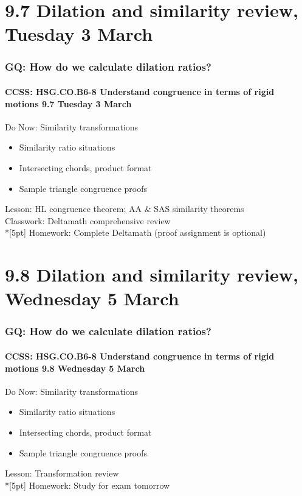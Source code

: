 \documentclass{beamer}
\begin{document}
\section{9.7 Dilation and similarity review, Tuesday 3 March}
\frame
{
  \frametitle{GQ: How do we calculate dilation ratios?}
  \framesubtitle{CCSS: HSG.CO.B6-8 Understand congruence in terms of rigid motions \hfill \alert{9.7 Tuesday 3 March}}
  \begin{block}{Do Now: Similarity transformations}
    \begin{itemize}
      \item Similarity ratio situations
      \item Intersecting chords, product format
      \item Sample triangle congruence proofs
    \end{itemize}
    \end{block}
    Lesson: HL congruence theorem; AA \& SAS similarity theorems \\
    Classwork: Deltamath comprehensive review \\*[5pt]
    Homework: Complete Deltamath (proof assignment is optional)
}

\section{9.8 Dilation and similarity review, Wednesday 5 March}
\frame
{
  \frametitle{GQ: How do we calculate dilation ratios?}
  \framesubtitle{CCSS: HSG.CO.B6-8 Understand congruence in terms of rigid motions \hfill \alert{9.8 Wednesday 5 March}}
  \begin{block}{Do Now: Similarity transformations}
    \begin{itemize}
      \item Similarity ratio situations
      \item Intersecting chords, product format
      \item Sample triangle congruence proofs
    \end{itemize}
    \end{block}
    Lesson: Transformation review \\*[5pt]
    Homework: Study for \alert{exam tomorrow}
}
\end{document}

